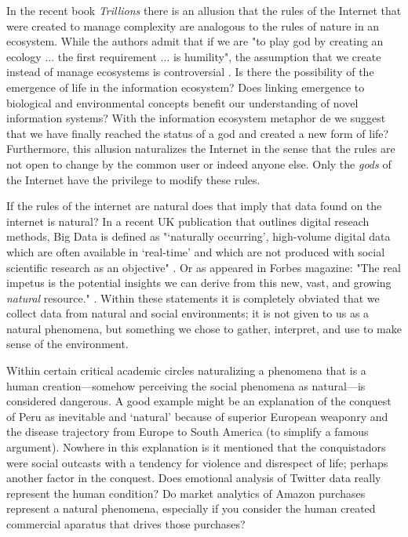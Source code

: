 In the recent book \textit{Trillions} there is an allusion that the rules of the Internet that were created to manage complexity are analogous to the rules of nature in an ecosystem. While the authors admit that if we are "to play god by creating an ecology ... the first requirement ... is humility", the assumption that we create instead of manage ecosystems is controversial \citep[][p. 140]{lucas_2012}. Is there the possibility of the emergence of life in the information ecosystem? Does linking emergence to biological and environmental concepts benefit our understanding of novel information systems? With the information ecosystem metaphor de we suggest that we have finally reached the status of a god and created a new form of life? Furthermore, this allusion naturalizes the Internet in the sense that the rules are not open to change by the common user or indeed anyone else. Only the \textit{gods} of the Internet have the privilege to modify these rules. 

If the rules of the internet are natural does that imply that data found on the internet is natural? In a recent UK publication that outlines digital reseach methods, Big Data is defined as "‘naturally occurring’, high-volume digital data which are often available in ‘real-time’ and which are not produced with social scientific research as an objective" \citep{ncrm_2015}. Or as appeared in Forbes magazine: "The real impetus is the potential insights we can derive from this new, vast, and growing \textit{natural} resource." \citep[][emphasis ours]{rotella_2012}. Within these statements it is completely obviated that we collect data from natural and social environments; it is not given to us as a natural phenomena, but something we chose to gather, interpret, and use to make sense of the environment.

Within certain critical academic circles naturalizing a phenomena that is a human creation—somehow perceiving the social phenomena as natural—is considered dangerous. A good example might be an explanation of the conquest of Peru as inevitable and ‘natural’ because of superior European weaponry and the disease trajectory from Europe to South America (to simplify a famous argument). Nowhere in this explanation is it mentioned that the conquistadors were social outcasts with a tendency for violence and disrespect of life; perhaps another factor in the conquest. Does emotional analysis of Twitter data really represent the human condition? Do market analytics of Amazon purchases represent a natural phenomena, especially if you consider the human created commercial aparatus that drives those purchases?  

